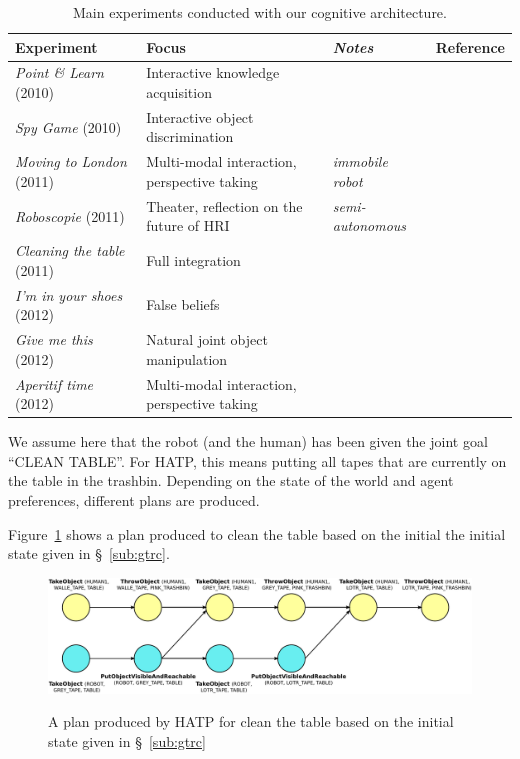 \documentclass[preprint,5p]{elsarticle}
\begin{document}
\begin{table}
\begin{center}

\begin{tabular}{llll}
 \bf{Experiment} & Focus & \emph{Notes} & Reference \\
\hline
{\it Point \& Learn} (2010) & Interactive knowledge acquisition & & \cite{Lemaignan2010} \\
{\it Spy Game} (2010) & Interactive object discrimination & & \cite{Ros2010b} \\
{\it Moving to London} (2011) & Multi-modal interaction, perspective taking & \emph{immobile robot} & \cite{lemaignan2011what} \\
{\it Roboscopie} (2011) & Theater, reflection on the future of HRI & \emph{semi-autonomous} & \cite{lemaignan2012roboscopie} \\
{\it Cleaning the table} (2011) & Full integration & & \cite{Alami2011} \\
{\it I'm in your shoes} (2012) & False beliefs & & \cite{warnier2012when} \\
{\it Give me this} (2012) & Natural joint object manipulation & & \cite{gharbi2013natural} \\
{\it Aperitif time} (2012) & Multi-modal interaction, perspective taking & & \cite{lemaignan2013talking} \\
\hline

\end{tabular}
\end{center}
\caption{Main experiments conducted with our cognitive architecture.}
\label{table|experiences}
\end{table}




We assume here that the robot (and the human) has been given the joint goal
``CLEAN TABLE''. For HATP, this means putting all tapes that are
currently on the table in the trashbin. Depending on the state of the
world and agent preferences, different plans are produced.

Figure~\ref{plan-etat2} shows a plan produced to clean the table based on the initial the initial state given in  \S~\ref{sub:gtrc}.

\begin{figure}[thpb]
  \centering
  \includegraphics[width=1.0\textwidth]{./figs/plan3.pdf} \\
  \caption {A plan produced by HATP for clean the table based on the initial state given in \S~\ref{sub:gtrc}}
  \label{plan-etat2}
\end{figure}
\end{document}
